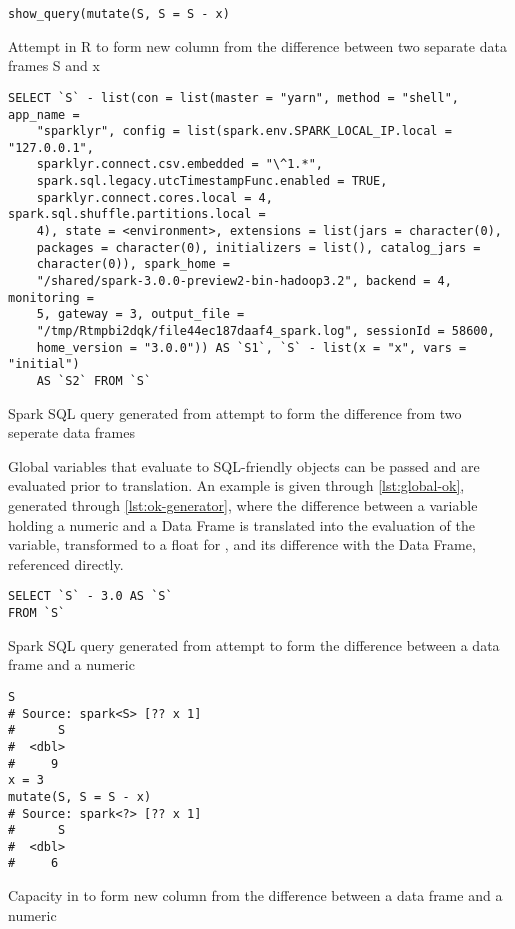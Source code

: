 \begin{listing}
	\begin{verbatim}
show_query(mutate(S, S = S - x)
\end{verbatim}
	\caption{Attempt in R to form new column from the difference between two separate  data frames S and x}
	\label{lst:bad}
\end{listing}

\begin{listing}
	\begin{verbatim}
SELECT `S` - list(con = list(master = "yarn", method = "shell", app_name =
	"sparklyr", config = list(spark.env.SPARK_LOCAL_IP.local = "127.0.0.1",
	sparklyr.connect.csv.embedded = "\^1.*",
	spark.sql.legacy.utcTimestampFunc.enabled = TRUE,
	sparklyr.connect.cores.local = 4, spark.sql.shuffle.partitions.local =
	4), state = <environment>, extensions = list(jars = character(0),
	packages = character(0), initializers = list(), catalog_jars =
	character(0)), spark_home =
	"/shared/spark-3.0.0-preview2-bin-hadoop3.2", backend = 4, monitoring =
	5, gateway = 3, output_file =
	"/tmp/Rtmpbi2dqk/file44ec187daaf4_spark.log", sessionId = 58600,
	home_version = "3.0.0")) AS `S1`, `S` - list(x = "x", vars = "initial")
	AS `S2` FROM `S`
\end{verbatim}
	\caption{Spark SQL query generated from attempt to form the difference from two seperate data frames}
	\label{lst:computer-no}
\end{listing}

Global variables that evaluate to SQL-friendly objects can be passed and
are evaluated prior to translation. An example is given through
\cref{lst:global-ok}, generated through \cref{lst:ok-generator}, where
the difference between a variable holding a numeric and a  Data
Frame is translated into the evaluation of the variable, transformed to
a float for , and its difference with the  Data Frame,
referenced directly.

\begin{listing}
	\begin{verbatim}
SELECT `S` - 3.0 AS `S`
FROM `S`
\end{verbatim}
	\caption{Spark SQL query generated from attempt to form the difference between a data frame and a numeric}
	\label{lst:global-ok}
\end{listing}

\begin{listing}
	\begin{verbatim}
S
# Source: spark<S> [?? x 1]
#      S
#  <dbl>
#     9
x = 3
mutate(S, S = S - x)
# Source: spark<?> [?? x 1]
#      S
#  <dbl>
#     6
\end{verbatim}
	\caption{Capacity in  to form new column from the difference between a  data frame and a numeric}
	\label{lst:ok-generator}
\end{listing}

